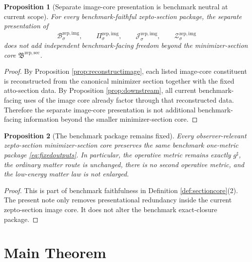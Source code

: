 \documentclass[11pt]{article}
\newcommand{\CompletedMetric}{g^{\sharp}}
\newcommand{\ZeptoImgBody}[1]{\mathcal B_{#1}^{\mathrm{zep,img}}}
\newcommand{\ZeptoImgProj}[1]{\Pi_{#1}^{\mathrm{zep,img}}}
\newcommand{\ZeptoImgFunctional}[1]{\mathscr J_{#1}^{\mathrm{zep,img}}}
\newcommand{\ZeptoImgShell}[1]{\mathcal Z_{#1}^{\mathrm{zep,img}}}
\newcommand{\ZeptoMinSectionCore}{\mathfrak B^{\mathrm{zep,sec}}}
\newtheorem{proposition}{Proposition}
\begin{document}
\begin{proposition}[Separate image-core presentation is benchmark neutral at current scope]
\label{prop:neutral}
For every benchmark-faithful zepto-section package, the separate presentation of
\[
\ZeptoImgBody{\sigma},
\qquad
\ZeptoImgProj{\sigma},
\qquad
\ZeptoImgFunctional{\sigma},
\qquad
\ZeptoImgShell{\sigma}
\]
does not add independent benchmark-facing freedom beyond the minimizer-section core \(\ZeptoMinSectionCore\).
\end{proposition}

\begin{proof}
By Proposition \ref{prop:reconstructimage}, each listed image-core constituent is reconstructed from the canonical minimizer section together with the fixed atto-section data. By Proposition \ref{prop:downstream}, all current benchmark-facing uses of the image core already factor through that reconstructed data. Therefore the separate image-core presentation is not additional benchmark-facing information beyond the smaller minimizer-section core.
\end{proof}

\begin{proposition}[The benchmark package remains fixed]
\label{prop:benchmark}
Every observer-relevant zepto-section minimizer-section core preserves the same benchmark one-metric package \eqref{eq:fixedoutputs}. In particular, the operative metric remains exactly \(\CompletedMetric\), the ordinary matter route is unchanged, there is no second operative metric, and the low-energy matter law is not enlarged.
\end{proposition}

\begin{proof}
This is part of benchmark faithfulness in Definition \ref{def:sectioncore}(2). The present note only removes presentational redundancy inside the current zepto-section image core. It does not alter the benchmark exact-closure package.
\end{proof}

\section{Main Theorem}
\end{document}
